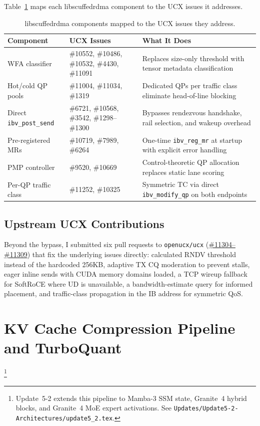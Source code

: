 \documentclass[11pt]{article}
\begin{document}
Table~\ref{tab:ucx_issue_map} maps each libscuffedrdma component to the UCX issues it addresses.

\begin{table}[ht]
\centering\small
\begin{tabular}{@{}p{4.2cm}p{3.0cm}p{5.5cm}@{}}
\toprule
\textbf{Component} & \textbf{UCX Issues} & \textbf{What It Does} \\
\midrule
WFA classifier & \#10552, \#10486, \#10532, \#4430, \#11091 & Replaces size-only threshold with tensor metadata classification \\
\addlinespace
Hot/cold QP pools & \#11004, \#11034, \#1319 & Dedicated QPs per traffic class eliminate head-of-line blocking \\
\addlinespace
Direct \texttt{ibv\_post\_send} & \#6721, \#10568, \#3542, \#1298--\#1300 & Bypasses rendezvous handshake, rail selection, and wakeup overhead \\
\addlinespace
Pre-registered MRs & \#10719, \#7989, \#6264 & One-time \texttt{ibv\_reg\_mr} at startup with explicit error handling \\
\addlinespace
PMP controller & \#9520, \#10669 & Control-theoretic QP allocation replaces static lane scoring \\
\addlinespace
Per-QP traffic class & \#11252, \#10325 & Symmetric TC via direct \texttt{ibv\_modify\_qp} on both endpoints \\
\bottomrule
\end{tabular}
\caption{libscuffedrdma components mapped to the UCX issues they address.}
\label{tab:ucx_issue_map}
\end{table}

\subsection{Upstream UCX Contributions}

Beyond the bypass, I submitted six pull requests to \texttt{openucx/ucx} (\href{https://github.com/openucx/ucx/pulls?q=is\%3Apr+author\%3Andg8743}{\#11304--\#11309}) that fix the underlying issues directly: calculated RNDV threshold instead of the hardcoded 256KB, adaptive TX CQ moderation to prevent stalls, eager inline sends with CUDA memory domains loaded, a TCP wireup fallback for SoftRoCE where UD is unavailable, a bandwidth-estimate query for informed placement, and traffic-class propagation in the IB address for symmetric QoS.

\section{KV Cache Compression Pipeline and TurboQuant}
\footnote{Update~5-2 extends this pipeline to Mamba-3 SSM state,
Granite~4 hybrid blocks, and Granite~4 MoE expert activations.
See \texttt{Updates/Update5-2-Architectures/update5\_2.tex}.}
\end{document}

